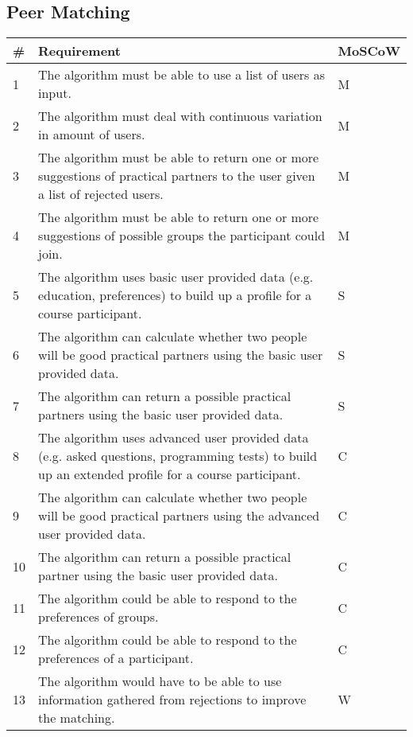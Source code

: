 \subsection{Peer Matching}
\begin{tabular}{ | p{0.5cm} | p{12cm} | p{2cm} | }
\hline
\textbf{\#} & \textbf{Requirement} & \textbf{MoSCoW} \\ \hline
1 & The algorithm must be able to use a list of users as input. & M \\ \hline
2 & The algorithm must deal with continuous variation in amount of users. & M \\ \hline
3 & The algorithm must be able to return one or more suggestions of practical partners to the user given a list of rejected users. & M \\ \hline
4 & The algorithm must be able to return one or more suggestions of possible groups the participant could join. & M \\ \hline
5 & The algorithm uses basic user provided data (e.g. education, preferences) to build up a profile for a course participant. & S \\ \hline
6 & The algorithm can calculate whether two people will be good practical partners using the basic user provided data. & S \\ \hline
7 & The algorithm can return a possible practical partners using the basic user provided data. & S \\ \hline
8 & The algorithm uses advanced user provided data (e.g. asked questions, programming tests) to build up an extended profile for a course participant. & C \\ \hline
9 & The algorithm can calculate whether two people will be good practical partners using the advanced user provided data. & C \\ \hline
10 & The algorithm can return a possible practical partner using the basic user provided data. & C \\ \hline
11 & The algorithm could be able to respond to the preferences of groups. & C \\ \hline
12 & The algorithm could be able to respond to the preferences of a participant. & C \\ \hline
13 & The algorithm would have to be able to use information gathered from rejections to improve the matching. & W \\
\hline
\end{tabular}

